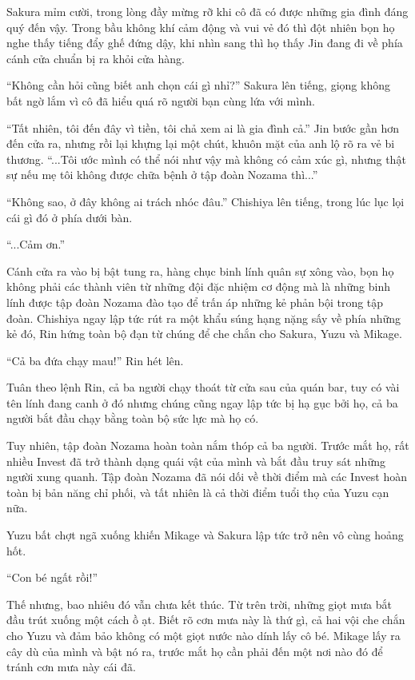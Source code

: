 {Sakura mỉm cười, trong lòng đầy mừng rỡ khi cô đã có được những gia đình
đáng quý đến vậy. Trong bầu không khí cảm động và vui vẻ đó thì đột
nhiên bọn họ nghe thấy tiếng đẩy ghế đứng dậy, khi nhìn sang thì họ thấy
Jin đang đi về phía cánh cửa chuẩn bị ra khỏi cửa hàng.

``Không cần hỏi cũng biết anh chọn cái gì nhỉ?'' Sakura lên tiếng, giọng
không bất ngờ lắm vì cô đã hiểu quá rõ người bạn cùng lứa với mình.

``Tất nhiên, tôi đến đây vì tiền, tôi chả xem ai là gia đình cả.'' Jin
bước gần hơn đến cửa ra, nhưng rồi lại khựng lại một chút, khuôn mặt của
anh lộ rõ ra vẻ bi thương. ``...Tôi ước mình có thể nói như vậy mà không
có cảm xúc gì, nhưng thật sự nếu mẹ tôi không được chữa bệnh ở tập đoàn
Nozama thì...''

``Không sao, ở đây không ai trách nhóc đâu.'' Chishiya lên tiếng, trong
lúc lục lọi cái gì đó ở phía dưới bàn.

``...Cảm ơn.''

Cánh cửa ra vào bị bật tung ra, hàng chục binh lính quân sự xông vào,
bọn họ không phải các thành viên từ những đội đặc nhiệm cơ động mà là
những binh lính được tập đoàn Nozama đào tạo để trấn áp những kẻ phản
bội trong tập đoàn. Chishiya ngay lập tức rút ra một khẩu súng hạng nặng
sấy về phía những kẻ đó, Rin hứng toàn bộ đạn từ chúng để che chắn cho
Sakura, Yuzu và Mikage.

``Cả ba đứa chạy mau!'' Rin hét lên.

Tuân theo lệnh Rin, cả ba người chạy thoát từ cửa sau của quán bar, tuy
có vài tên lính đang canh ở đó nhưng chúng cũng ngay lập tức bị hạ gục
bởi họ, cả ba người bắt đầu chạy bằng toàn bộ sức lực mà họ có.

Tuy nhiên, tập đoàn Nozama hoàn toàn nắm thóp cả ba người. Trước mắt họ,
rất nhiều Invest đã trở thành dạng quái vật của mình và bắt đầu truy sát
những người xung quanh. Tập đoàn Nozama đã nói dối về thời điểm mà các
Invest hoàn toàn bị bản năng chỉ phối, và tất nhiên là cả thời điểm tuổi
thọ của Yuzu cạn nữa.

Yuzu bất chợt ngã xuống khiến Mikage và Sakura lập tức trở nên vô cùng
hoảng hốt.

``Con bé ngất rồi!''

Thế nhưng, bao nhiêu đó vẫn chưa kết thúc. Từ trên trời, những giọt mưa
bắt đầu trút xuống một cách ồ ạt. Biết rõ cơn mưa này là thứ gì, cả hai
vội che chắn cho Yuzu và đảm bảo không có một giọt nước nào dính lấy cô
bé. Mikage lấy ra cây dù của mình và bật nó ra, trước mắt họ cần phải
đến một nơi nào đó để tránh cơn mưa này cái đã.

}
